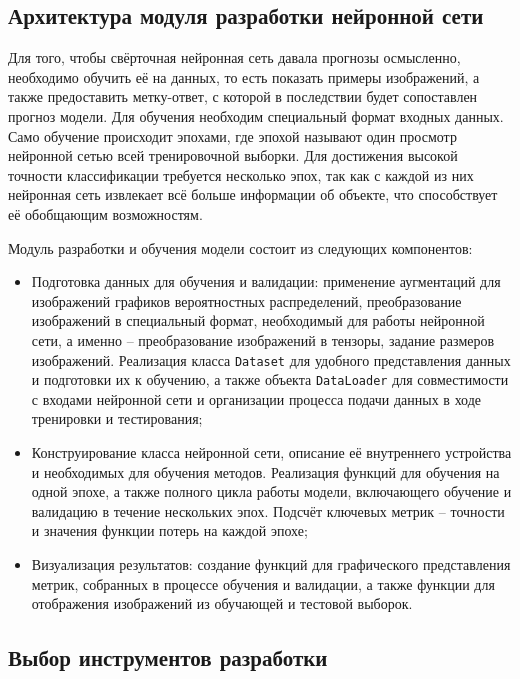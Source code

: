 \documentclass[14pt, russian]{scrartcl}
\begin{document}
\subsection{Архитектура модуля разработки нейронной сети}
Для того, чтобы свёрточная нейронная сеть давала прогнозы осмысленно, необходимо обучить её на данных, то есть показать примеры изображений, а также предоставить метку-ответ, с которой в последствии будет сопоставлен прогноз модели. Для обучения необходим специальный формат входных данных. Само обучение происходит эпохами, где эпохой называют один просмотр нейронной сетью всей тренировочной выборки. Для достижения высокой точности классификации требуется несколько эпох, так как с каждой из них нейронная сеть извлекает всё больше информации об объекте, что способствует её обобщающим возможностям.

Модуль разработки и обучения модели состоит из следующих компонентов: 
\begin{itemize}
    \item Подготовка данных для обучения и валидации: применение аугментаций для изображений графиков вероятностных распределений, преобразование изображений в специальный формат, необходимый для работы нейронной сети, а именно -- преобразование изображений в тензоры, задание размеров изображений. Реализация класса \verb|Dataset| для удобного представления данных и подготовки их к обучению, а также объекта \verb|DataLoader| для совместимости с входами нейронной сети и организации процесса подачи данных в ходе тренировки и тестирования;
    \item Конструирование класса нейронной сети, описание её внутреннего устройства и необходимых для обучения методов. Реализация функций для обучения на одной эпохе, а также полного цикла работы модели, включающего обучение и валидацию в течение нескольких эпох. Подсчёт ключевых метрик -- точности и значения функции потерь на каждой эпохе;
    \item Визуализация результатов: создание функций для графического представления метрик, собранных в процессе обучения и валидации, а также функции для отображения изображений из обучающей и тестовой выборок. 
\end{itemize}

\subsection{Выбор инструментов разработки}
\end{document}
